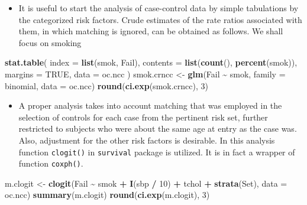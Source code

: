 \documentclass[
]{book}
\newenvironment{Shaded}{\begin{snugshade}}{\end{snugshade}}
\newcommand{\AttributeTok}[1]{\textcolor[rgb]{0.13,0.29,0.53}{#1}}
\newcommand{\ConstantTok}[1]{\textcolor[rgb]{0.56,0.35,0.01}{#1}}
\newcommand{\DecValTok}[1]{\textcolor[rgb]{0.00,0.00,0.81}{#1}}
\newcommand{\FunctionTok}[1]{\textcolor[rgb]{0.13,0.29,0.53}{\textbf{#1}}}
\newcommand{\NormalTok}[1]{#1}
\newcommand{\OtherTok}[1]{\textcolor[rgb]{0.56,0.35,0.01}{#1}}
\newcommand{\SpecialCharTok}[1]{\textcolor[rgb]{0.81,0.36,0.00}{\textbf{#1}}}
\providecommand{\tightlist}{%
  \setlength{\itemsep}{0pt}\setlength{\parskip}{0pt}}
\begin{document}
\begin{itemize}
\tightlist
\item
  It is useful to start the analysis of case-control data by
  simple tabulations by the categorized risk factors.
  Crude estimates of the rate ratios associated with them,
  in which matching is ignored, can be obtained as follows.
  We shall focus on smoking
\end{itemize}

\begin{Shaded}
\begin{Highlighting}[]
\FunctionTok{stat.table}\NormalTok{(}
  \AttributeTok{index =} \FunctionTok{list}\NormalTok{(smok, Fail),}
  \AttributeTok{contents =} \FunctionTok{list}\NormalTok{(}\FunctionTok{count}\NormalTok{(), }\FunctionTok{percent}\NormalTok{(smok)),}
  \AttributeTok{margins =} \ConstantTok{TRUE}\NormalTok{, }
  \AttributeTok{data =}\NormalTok{ oc.ncc}
\NormalTok{)}
\NormalTok{smok.crncc }\OtherTok{\textless{}{-}} \FunctionTok{glm}\NormalTok{(Fail }\SpecialCharTok{\textasciitilde{}}\NormalTok{ smok, }\AttributeTok{family =}\NormalTok{ binomial, }\AttributeTok{data =}\NormalTok{ oc.ncc)}
\FunctionTok{round}\NormalTok{(}\FunctionTok{ci.exp}\NormalTok{(smok.crncc), }\DecValTok{3}\NormalTok{)}
\end{Highlighting}
\end{Shaded}

\begin{itemize}
\tightlist
\item
  A proper analysis takes into account matching that was employed
  in the selection of controls for each case from the
  pertinent risk set, further restricted to
  subjects who were about the same age at entry as the case was.
  Also, adjustment for the other risk factors is desirable.
  In this analysis function \texttt{clogit()} in \texttt{survival} package is
  utilized. It is in fact a wrapper of function \texttt{coxph()}.
\end{itemize}

\begin{Shaded}
\begin{Highlighting}[]
\NormalTok{m.clogit }\OtherTok{\textless{}{-}} \FunctionTok{clogit}\NormalTok{(Fail }\SpecialCharTok{\textasciitilde{}}\NormalTok{ smok }\SpecialCharTok{+} \FunctionTok{I}\NormalTok{(sbp }\SpecialCharTok{/} \DecValTok{10}\NormalTok{) }\SpecialCharTok{+}\NormalTok{ tchol }\SpecialCharTok{+}
  \FunctionTok{strata}\NormalTok{(Set), }\AttributeTok{data =}\NormalTok{ oc.ncc)}
\FunctionTok{summary}\NormalTok{(m.clogit)}
\FunctionTok{round}\NormalTok{(}\FunctionTok{ci.exp}\NormalTok{(m.clogit), }\DecValTok{3}\NormalTok{)}
\end{Highlighting}
\end{Shaded}
\end{document}
